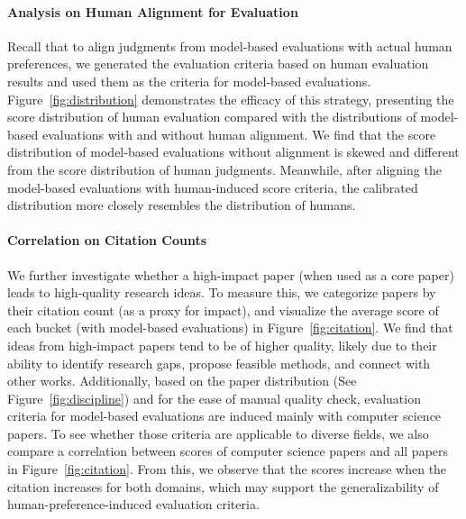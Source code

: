 \documentclass[11pt]{article}
\begin{document}
\paragraph{Analysis on Human Alignment for Evaluation}
Recall that to align judgments from model-based evaluations with actual human preferences, we generated the evaluation criteria based on human evaluation results and used them as the criteria for model-based evaluations. Figure~\ref{fig:distribution} demonstrates the efficacy of this strategy, presenting the score distribution of human evaluation compared with the distributions of model-based evaluations with and without human alignment. We find that the score distribution of model-based evaluations without alignment is skewed and different from the score distribution of human judgments. Meanwhile, after aligning the model-based evaluations with human-induced score criteria, the calibrated distribution more closely resembles the distribution of humans.

\paragraph{Correlation on Citation Counts}
We further investigate whether a high-impact paper (when used as a core paper) leads to high-quality research ideas. To measure this, we categorize papers by their citation count (as a proxy for impact), and visualize the average score of each bucket (with model-based evaluations) in Figure~\ref{fig:citation}. We find that ideas from high-impact papers tend to be of higher quality, likely due to their ability to identify research gaps, propose feasible methods, and connect with other works. Additionally, based on the paper distribution (See Figure~\ref{fig:discipline}) and for the ease of manual quality check, evaluation criteria for model-based evaluations are induced mainly with computer science papers. To see whether those criteria are applicable to diverse fields, we also compare a correlation between scores of computer science papers and all papers in Figure~\ref{fig:citation}. From this, we observe that the scores increase when the citation increases for both domains, which may support the generalizability of human-preference-induced evaluation criteria.
\end{document}
